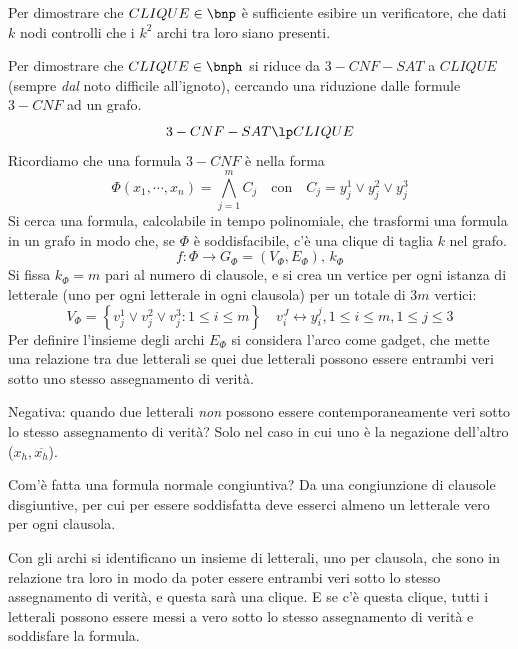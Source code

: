 Per dimostrare che $CLIQUE \in \bnp$ è sufficiente esibire un verificatore, che dati $k$ nodi controlli che i $k^2$ archi tra loro siano presenti.

Per dimostrare che $CLIQUE \in \bnph$ si riduce da $3-CNF-SAT$ a $CLIQUE$ (sempre \emph{dal} noto difficile all'ignoto), cercando una riduzione dalle formule $3-CNF$ ad un grafo.
\begin{equation*}
    3-CNF-SAT \lp CLIQUE
\end{equation*}
Ricordiamo che una formula $3-CNF$ è nella forma
\begin{equation*}
    \Phi \left( x_1, \cdots, x_n \right) = 
    \bigwedge\limits_{j=1}^{m}
    C_j
    \quad
    \text{con}
    \quad
    C_j = y_j^1 \vee y_j^2 \vee y_j^3
\end{equation*}
Si cerca una formula, calcolabile in tempo polinomiale, che trasformi una formula in un grafo in modo che, se $\Phi$ è soddisfacibile, c'è una clique di taglia $k$ nel grafo.
\begin{equation*}
    f : \Phi \to G_{\Phi} = \left( V_{\Phi} , E_{\Phi} \right), \, k_{\Phi}
\end{equation*}
Si fissa $k_{\Phi} = m$ pari al numero di clausole, e si crea un vertice per ogni istanza di letterale (uno per ogni letterale in ogni clausola) per un totale di $3m$ vertici:
$$
V_{\Phi} = 
\left\{ 
v_j^1 \vee v_j^2 \vee v_j^3
: 1 \le i \le m
\right\}
\quad
v_i^J \leftrightarrow y_i^j, 
1 \le i \le m,
1 \le j \le 3
$$
Per definire l'insieme degli archi $E_{\Phi}$ si considera l'arco come gadget, che mette una relazione tra due letterali se quei due letterali possono essere entrambi veri sotto uno stesso assegnamento di verità.

Negativa: quando due letterali \emph{non} possono essere contemporaneamente veri sotto lo stesso assegnamento di verità? Solo nel caso in cui uno è la negazione dell'altro ($x_h, \overline{x_h}$).

Com'è fatta una formula normale congiuntiva? Da una congiunzione di clausole disgiuntive, per cui per essere soddisfatta deve esserci almeno un letterale vero per ogni clausola.

Con gli archi si identificano un insieme di letterali, uno per clausola, che sono in relazione tra loro in modo da poter essere entrambi veri sotto lo stesso assegnamento di verità, e questa sarà una clique. E se c'è questa clique, tutti i letterali possono essere messi a vero sotto lo stesso assegnamento di verità e soddisfare la formula.

